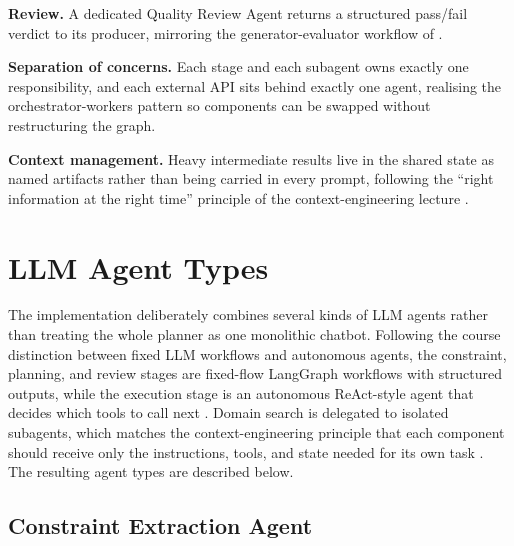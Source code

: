 \documentclass[a4paper,oneside,bibliography=totoc]{scrbook}
\begin{document}
\textbf{Review.} A dedicated Quality Review Agent returns a structured
pass/fail verdict to its producer, mirroring the generator-evaluator
workflow of \cite{schluntz2024agents}.

\textbf{Separation of concerns.} Each stage and each subagent owns
exactly one responsibility, and each external API sits behind exactly
one agent, realising the orchestrator-workers pattern
\cite{schluntz2024agents} so components can be swapped without
restructuring the graph.

\textbf{Context management.} Heavy intermediate results live in the
shared state as named artifacts rather than being carried in every
prompt, following the ``right information at the right time'' principle
of the context-engineering lecture \cite{rajasekaran2025context}.




\section{LLM Agent Types}

The implementation deliberately combines several kinds of LLM agents rather
than treating the whole planner as one monolithic chatbot. Following the
course distinction between fixed LLM workflows and autonomous agents, the
constraint, planning, and review stages are fixed-flow LangGraph workflows
with structured outputs, while the execution stage is an autonomous ReAct-style
agent that decides which tools to call next \cite{yao2023react}. Domain search
is delegated to isolated subagents, which matches the context-engineering
principle that each component should receive only the instructions, tools, and
state needed for its own task \cite{rajasekaran2025context}. The resulting
agent types are described below.

\subsection{Constraint Extraction Agent}
\end{document}
